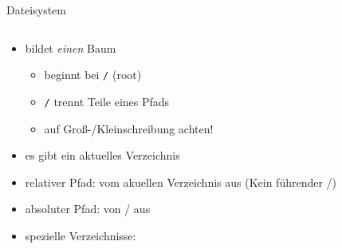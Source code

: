 \begin{frame}{Dateisystem}
  \begin{columns}[onlytextwidth]
    \begin{column}{0.475\textwidth}
      \begin{itemize}
        \item bildet \emph{einen} Baum
          \begin{itemize}
            \item beginnt bei \texttt{/} (root)
            \item \texttt{/} trennt Teile eines Pfads
            \item auf Groß-/Kleinschreibung achten!
          \end{itemize}
        \item es gibt ein aktuelles Verzeichnis
        \item relativer Pfad: vom akuellen Verzeichnis aus (Kein führender \alert{/})
        \item absoluter Pfad: von \alert{/} aus
        \item spezielle Verzeichnisse:
      \end{itemize}
    \end{column}
  \end{columns}
\end{frame}

